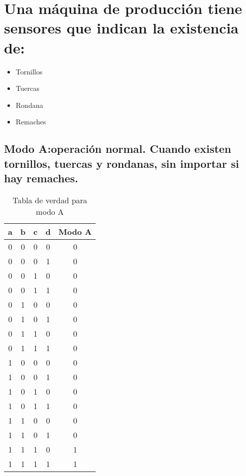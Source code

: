 \section{Una máquina de producción tiene sensores que indican la existencia de:}
\begin{itemize}
    \item \large Tornillos
    \item \large Tuercas
    \item \large Rondana
    \item \large Remaches
\end{itemize}
\subsection{Modo A:operación normal. Cuando existen tornillos, tuercas y rondanas, sin importar si hay remaches.}
\begin{table}[!ht]
    \centering
    \begin{tabular}{|c|c|c|c|c|}
        \hline
        a & b & c & d & Modo A \\
        \hline
        0 & 0 & 0 & 0 & 0 \\
        \hline
        0 & 0 & 0 & 1 & 0 \\
        \hline
        0 & 0 & 1 & 0 & 0 \\
        \hline
        0 & 0 & 1 & 1 & 0 \\
        \hline
        0 & 1 & 0 & 0 & 0 \\
        \hline
        0 & 1 & 0 & 1 & 0 \\
        \hline
        0 & 1 & 1 & 0 & 0 \\
        \hline
        0 & 1 & 1 & 1 & 0 \\
        \hline
        1 & 0 & 0 & 0 & 0 \\
        \hline
        1 & 0 & 0 & 1 & 0 \\
        \hline
        1 & 0 & 1 & 0 & 0 \\
        \hline
        1 & 0 & 1 & 1 & 0 \\
        \hline
        1 & 1 & 0 & 0 & 0 \\
        \hline
        1 & 1 & 0 & 1 & 0 \\
        \hline
        1 & 1 & 1 & 0 & 1 \\
        \hline
        1 & 1 & 1 & 1 & 1 \\
        \hline        
    \end{tabular}
    \caption{Tabla de verdad para modo A}\label{table:modo-A}
\end{table}
\newpage
